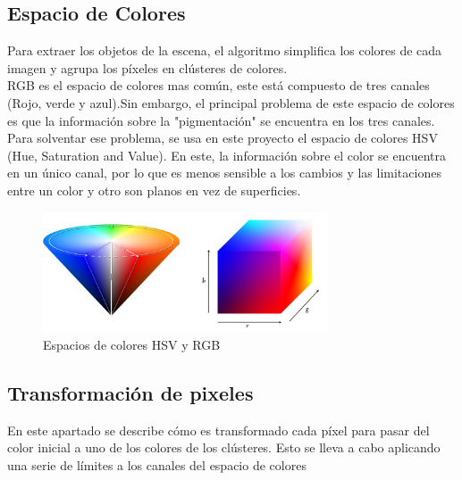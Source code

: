 \subsection{Espacio de Colores}
Para extraer los objetos de la escena, el algoritmo simplifica los colores de cada imagen y agrupa los p\'ixeles en cl\'usteres de colores. \\

RGB es el espacio de colores mas com\'un, este est\'a compuesto de tres canales (Rojo, verde y azul).Sin embargo, el principal problema de este espacio de colores es que la información sobre la "pigmentaci\'on" se encuentra en los tres canales.\\

Para solventar ese problema, se usa en este proyecto el espacio de colores HSV (Hue, Saturation and Value). En este, la información sobre el color se encuentra en un único canal, por lo que es menos sensible a los cambios y las limitaciones entre un color y otro son planos en vez de superficies. \\

\begin{figure}[h]
	\centering
	\includegraphics[width=0.75\textwidth,natwidth=944,natheight=400]{../Images/c2/HSV_vs_RGB.png}
	\caption{Espacios de colores HSV y RGB}
	\label{fig:HSV_vs_RGB}
\end{figure}

\subsection{Transformaci\'on de pixeles}
En este apartado se describe c\'omo es transformado cada p\'ixel para pasar del color inicial a uno de los colores de los cl\'usteres. Esto se lleva a cabo aplicando una serie de límites a los canales del espacio de colores \\

